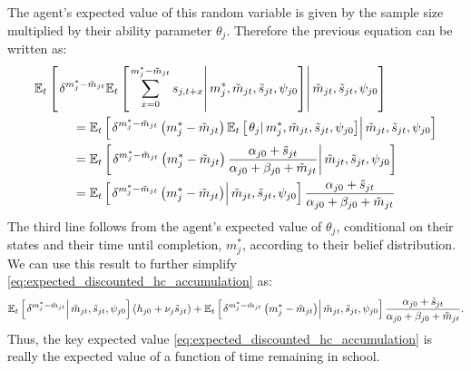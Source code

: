 \documentclass[11 pt]{article}
\newcommand{\pr}[1]{\left( #1 \right)}
\newcommand{\ce}[2]{\left[\left. #1 \right\vert #2 \right]}
\newcommand{\study}{m} %
\newcommand{\pass}{s}
\newcommand{\pstates}{\tilde{\study}_{jt}, \tilde{\pass}_{jt}, \psi_{j0}}
\newcommand*{\ks}[1][t]{\tilde{\pass}_{j #1}}
\begin{document}
The agent's expected value of this random variable is given by the sample size multiplied by their ability parameter $\theta_j$. 
Therefore the previous equation can be written as:
\begin{align}
    \nonumber
    \EE_t &\ce{
        \delta^{\study_j^* - \tilde{\study}_{jt}}
        \EE_t \ce{
            \sum_{x=0}^{\study_j^* - \tilde{\study}_{jt}} \pass_{j, t + x}
        }{\study_j^*, \pstates}
    }{\pstates}
    \\
    \nonumber
    &\quad\quad=
    \EE_t \ce{
        \delta^{\study_j^* - \tilde{\study}_{jt}}
        \pr{\study_j^* - \tilde{\study}_{jt}}
        \EE_t \ce{
            \theta_j
        }{\study_j^*, \pstates}
    }{\pstates}
    \\
    \nonumber
    &\quad\quad=
    \EE_t \ce{
        \delta^{\study_j^* - \tilde{\study}_{jt}}
        \pr{\study_j^* - \tilde{\study}_{jt}}
        \frac{\alpha_{j0} + \ks}{\alpha_{j0} + \beta_{j0} + \tilde{\study}_{jt}}
    }{\pstates}    
    \\
    \nonumber
    &\quad\quad=
    \EE_t \ce{
        \delta^{\study_j^* - \tilde{\study}_{jt}}
        \pr{\study_j^* - \tilde{\study}_{jt}}
    }{\pstates}
    \frac{\alpha_{j0} + \ks}{\alpha_{j0} + \beta_{j0} + \tilde{\study}_{jt}}
\end{align}
The third line follows from the agent's expected value of $\theta_j$, conditional on their states and their time until completion, $\study_j^*$, according to their belief distribution.
We can use this result to further simplify \eqref{eq:expected_discounted_hc_accumulation} as:
\begin{equation*}
    \EE_t \ce{
        \delta^{\study_j^* - \tilde{\study}_{jt}}        
    }{\pstates} \pr{h_{j0} + \nu_j \ks}
    + 
    \EE_t \ce{
        \delta^{\study_j^* - \tilde{\study}_{jt}}
        \pr{\study_j^* - \tilde{\study}_{jt}}
    }{\pstates}
    \frac{\alpha_{j0} + \ks}{\alpha_{j0} + \beta_{j0} + \tilde{\study}_{jt}}.
\end{equation*}
Thus, the key expected value \eqref{eq:expected_discounted_hc_accumulation} is really the expected value of a function of time remaining in school.
\end{document}
